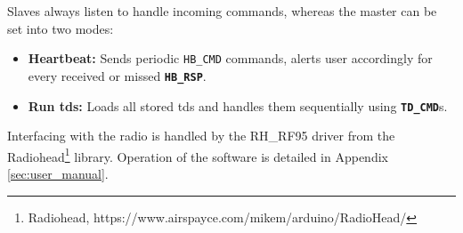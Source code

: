 Slaves always listen to handle incoming commands, whereas the master can be set into two modes:
\vspace{-5mm}
\begin{itemize}
	\item \textbf{Heartbeat:} Sends periodic \texttt{HB\_CMD} commands, alerts user accordingly for every received or missed \textbf{\texttt{HB\_RSP}}.
	\item {\textbf{Run \ac{td}s:} Loads all stored \ac{td}s and handles them sequentially using \textbf{\texttt{TD\_CMD}}s.}
\end{itemize}
Interfacing with the radio is handled by the RH\_RF95 driver from the Radiohead\footnote{Radiohead, https://www.airspayce.com/mikem/arduino/RadioHead/} library. Operation of the software is detailed in Appendix \ref{sec:user_manual}.

